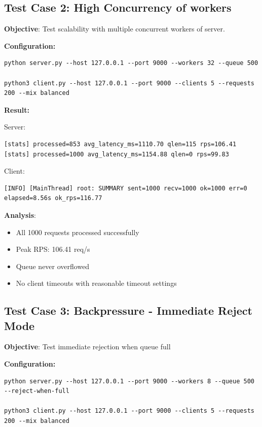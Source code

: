 \documentclass[12pt]{article}
\begin{document}
\subsection{Test Case 2: High Concurrency of workers}

\textbf{Objective}: Test scalability with multiple concurrent workers of server.

\textbf{Configuration:}
\begin{verbatim}
python server.py --host 127.0.0.1 --port 9000 --workers 32 --queue 500

python3 client.py --host 127.0.0.1 --port 9000 --clients 5 --requests 200 --mix balanced
\end{verbatim}

\textbf{Result:}

Server:
\begin{verbatim}
[stats] processed=853 avg_latency_ms=1110.70 qlen=115 rps=106.41
[stats] processed=1000 avg_latency_ms=1154.88 qlen=0 rps=99.83
\end{verbatim}

Client:
\begin{verbatim}
[INFO] [MainThread] root: SUMMARY sent=1000 recv=1000 ok=1000 err=0 elapsed=8.56s ok_rps=116.77
\end{verbatim}

\textbf{Analysis}:
\begin{itemize}
    \item All 1000 requests processed successfully
    \item Peak RPS: 106.41 req/s
    \item Queue never overflowed
    \item No client timeouts with reasonable timeout settings
\end{itemize}

\subsection{Test Case 3: Backpressure - Immediate Reject Mode}

\textbf{Objective}: Test immediate rejection when queue full

\textbf{Configuration:}
\begin{verbatim}
python server.py --host 127.0.0.1 --port 9000 --workers 8 --queue 500 --reject-when-full

python3 client.py --host 127.0.0.1 --port 9000 --clients 5 --requests 200 --mix balanced
\end{verbatim}
\end{document}
